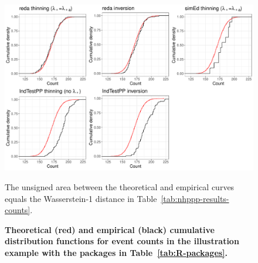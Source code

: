\documentclass[article,nojss]{jss}\usepackage[]{graphicx}\usepackage[]{xcolor}
\makeatletter
\def\maxwidth{ %
  \ifdim\Gin@nat@width>\linewidth
    \linewidth
  \else
    \Gin@nat@width
  \fi
}
\makeatother
\begin{document}
\begin{Schunk}
\begin{figure}[ht!]
\caption{{\bf Theoretical (red) and empirical (black) cumulative distribution functions for event counts in the illustration example with the  packages in Table~\ref{tab:R-packages}.}}\label{fig:r-pkgs-pkg-counts}
\includegraphics[width=\maxwidth]{figure/r-pkgs-pkg-counts-1} 
\begin{flushleft}
The unsigned area between the theoretical and empirical curves equals the Wasserstein-1 distance in Table~\ref{tab:nhppp-results-counts}.
\end{flushleft}
\end{figure}
\end{Schunk}
\end{document}
